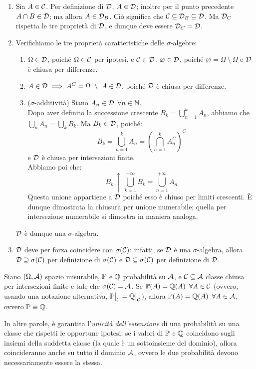 \begin{dimo}
\begin{enumerate}
  \item Sia $A \in \mathcal C$. Per definizione di $\mathcal D$, $A \in \mathcal D$; inoltre per il punto precedente $A \cap B \in \mathcal D$; ma allora $A \in \mathcal D_B$. Ciò significa che $\mathcal C \subseteq \mathcal D_B \subseteq \mathcal D$. Ma $\mathcal D_C$ rispetta le tre proprietà di $\mathcal D$, e dunque deve essere $\mathcal D_C = \mathcal D$.
  \item Verifichiamo le tre proprietà caratteristiche delle $\sigma$-algebre:
  \begin{enumerate}
    \item $\Omega \in \mathcal D$, poiché $\Omega \in \mathcal C$ per ipotesi, e $\mathcal C \in \mathcal D$. $\varnothing \in \mathcal D$, poiché $\varnothing = \Omega \ \setminus \ \Omega$ e $\mathcal D$ è chiusa per differenze.
    \item $ A \in \Dc \implies A^C = \Omega \ \setminus \ A \in \Dc$, poiché $\mathcal D$ è chiusa per differenze.
    \item ($\sigma$-additività) Siano $ A_n \in \mathcal D \enspace \forall n \in \mathbb N.$ \\
    Dopo aver definito la successione crescente $B_k = \bigcup_{n=1}^{k} A_n$, abbiamo che $\bigcup_n A_n = \bigcup_k B_k$.
    Ma $ B_k \in \mathcal D$, poiché:
    $$B_k = \bigcup_{n=1}^k A_n = \left( \bigcap_{n=1}^k A_n^C \right)^C$$
    e $\mathcal D$ è chiusa per intersezioni finite. \\
    Abbiamo poi che:
    $$B_k \, \uparrow \, \bigcup_{k=1}^{{+\infty}} B_k = \bigcup_{n=1}^{{+\infty}} A_n$$
    Questa unione appartiene a $\mathcal D$ poiché esso è chiuso per limiti crescenti.
    È dunque dimostrata la chiusura per unione numerabile; quella per intersezione numerabile si dimostra in maniera analoga.
  \end{enumerate}
  $\mathcal D$ è dunque una $\sigma$-algebra.
  \item $\mathcal D$ deve per forza coincidere con $\sigma(\mathcal C)$: infatti, se $\mathcal D$ è una $\sigma$-algebra, allora $\mathcal D \supseteq \sigma(\mathcal C)$ per definizione di $\sigma(\mathcal C)$ e $ \mathcal D \subseteq \sigma(\mathcal C)$ per definizione di $\mathcal D$. \qedhere
  \end{enumerate}
\end{dimo}

\medskip
\begin{coro}\label{coro-estensione-prob}
  Siano $(\Omega, \mathcal A)$ spazio misurabile, $\mathbb P$ e $\mathbb Q$ probabilità su $\mathcal A$, e $\mathcal C \subseteq \mathcal A$ classe chiusa per intersezioni finite e tale che $\sigma(\mathcal C) = \mathcal A$.
  Se $\mathbb P(A) = \mathbb Q(A) \enspace \forall A \in \mathcal C$ (ovvero, usando una notazione alternativa, $\mathbb P\big|_{\mathcal C} = \mathbb Q\big|_{\mathcal C}$), allora $\mathbb P(A) = \mathbb Q(A) \enspace \forall A \in \mathcal A$, ovvero $\mathbb P \equiv \mathbb Q$.
\end{coro}
In altre parole, è garantita l'\emph{unicità dell'estensione} di una probabilità su una classe che rispetti le opportune ipotesi: se i valori di $\mathbb P$ e $\mathbb Q$ coincidono sugli insiemi della suddetta classe (la quale è un sottoinsieme del dominio), allora coincideranno anche su tutto il dominio $\mathcal A$, ovvero le due probabilità devono necessariamente essere la stessa.

